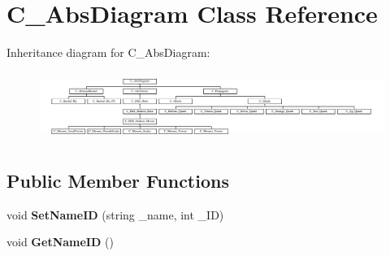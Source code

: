 \hypertarget{class_c___abs_diagram}{\section{C\-\_\-\-Abs\-Diagram Class Reference}
\label{class_c___abs_diagram}
}
Inheritance diagram for C\-\_\-\-Abs\-Diagram\-:\begin{figure}[H]
\begin{center}
\leavevmode
\includegraphics[height=2.248996cm]{class_c___abs_diagram}
\end{center}
\end{figure}
\subsection*{Public Member Functions}
\begin{DoxyCompactItemize}
\item 
\hypertarget{class_c___abs_diagram_a88baf4e9d29753417b7e65ef18f0b28f}{void {\bfseries Set\-Name\-I\-D} (string \-\_\-name, int \-\_\-\-I\-D)}\label{class_c___abs_diagram_a88baf4e9d29753417b7e65ef18f0b28f}

\item 
\hypertarget{class_c___abs_diagram_a5a52da1cfd635da06a6bfdd002e7f674}{void {\bfseries Get\-Name\-I\-D} ()}\label{class_c___abs_diagram_a5a52da1cfd635da06a6bfdd002e7f674}

\end{DoxyCompactItemize}
